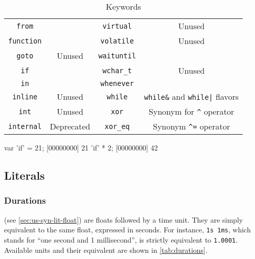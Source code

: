 \begin{table}[\floatpos]
\begin{tabular}{|c|c||c|c|}
    \lstinline"from"              &                                         &
    \lstinline"virtual"           & Unused                                  \\
    \lstinline"function"          &                                         &
    \lstinline"volatile"          & Unused                                  \\
    \lstinline"goto"              & Unused                                  &
    \lstinline"waituntil"         &                                         \\
    \lstinline"if"                &                                         &
    \lstinline"wchar_t"           & Unused                                  \\
    \lstinline"in"                &                                         &
    \lstinline"whenever"          &                                         \\
    \lstinline"inline"            & Unused                                  &
    \lstinline"while"             & \lstinline|while&| and
                                    \lstinline-while|- flavors              \\
    \lstinline"int"               & Unused                                  &
    \lstinline"xor"               & Synonym for \lstinline|^| operator      \\
    \lstinline"internal"          & Deprecated                              &
    \lstinline"xor_eq"            & Synonym \lstinline|^=| operator         \\
    \hline
  \end{tabular}
  \caption{Keywords}
  \label{tab:keywords}
\end{table}
\renewcommand{\baselinestretch}{1}

\begin{urbiscript}[caption=Escaping keywords,label=lst:escape-keyword,float=\floatpos]
var 'if' = 21;
[00000000] 21
'if' * 2;
[00000000] 42
\end{urbiscript}

\subsection{Literals}
\subsubsection{Durations}

 (see \autoref{sec:us-syn-lit-float}) are floats
followed by a
time unit. They are simply equivalent to the same float, expressed in
seconds. For instance, \lstinline|1s 1ms|, which stands for ``one
second and 1 millisecond'', is strictly equivalent to
\lstinline|1.0001|. Available units
and their equivalent are shown in \autoref{tab:durations}.

